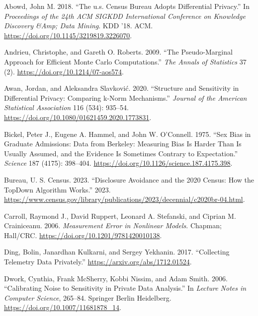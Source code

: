 \hypertarget{refs}{}
\begin{CSLReferences}{1}{0}
\leavevmode{}%
Abowd, John M. 2018. {``The u.s. Census Bureau Adopts Differential Privacy.''} In \emph{Proceedings of the 24th ACM SIGKDD International Conference on Knowledge Discovery \&Amp; Data Mining}. KDD '18. ACM. \url{https://doi.org/10.1145/3219819.3226070}.

\leavevmode{}%
Andrieu, Christophe, and Gareth O. Roberts. 2009. {``The Pseudo-Marginal Approach for Efficient Monte Carlo Computations.''} \emph{The Annals of Statistics} 37 (2). \url{https://doi.org/10.1214/07-aos574}.

\leavevmode{}%
Awan, Jordan, and Aleksandra Slavković. 2020. {``Structure and Sensitivity in Differential Privacy: Comparing k-Norm Mechanisms.''} \emph{Journal of the American Statistical Association} 116 (534): 935--54. \url{https://doi.org/10.1080/01621459.2020.1773831}.

\leavevmode{}%
Bickel, Peter J., Eugene A. Hammel, and John W. O'Connell. 1975. {``Sex Bias in Graduate Admissions: Data from Berkeley: Measuring Bias Is Harder Than Is Usually Assumed, and the Evidence Is Sometimes Contrary to Expectation.''} \emph{Science} 187 (4175): 398--404. \url{https://doi.org/10.1126/science.187.4175.398}.

\leavevmode{}%
Bureau, U. S. Census. 2023. {``Disclosure Avoidance and the 2020 Census: How the TopDown Algorithm Works.''} 2023. \url{https://www.census.gov/library/publications/2023/decennial/c2020br-04.html}.

\leavevmode{}%
Carroll, Raymond J., David Ruppert, Leonard A. Stefanski, and Ciprian M. Crainiceanu. 2006. \emph{Measurement Error in Nonlinear Models}. Chapman; Hall/CRC. \url{https://doi.org/10.1201/9781420010138}.

\leavevmode{}%
Ding, Bolin, Janardhan Kulkarni, and Sergey Yekhanin. 2017. {``Collecting Telemetry Data Privately.''} \url{https://arxiv.org/abs/1712.01524}.

\leavevmode{}%
Dwork, Cynthia, Frank McSherry, Kobbi Nissim, and Adam Smith. 2006. {``Calibrating Noise to Sensitivity in Private Data Analysis.''} In \emph{Lecture Notes in Computer Science}, 265--84. Springer Berlin Heidelberg. \url{https://doi.org/10.1007/11681878_14}.


\end{CSLReferences}

